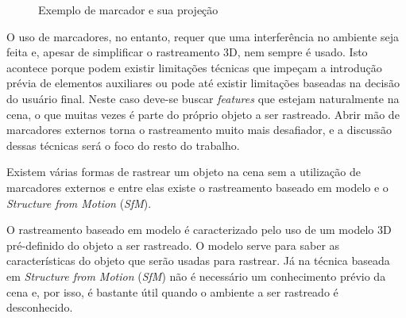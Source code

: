 \begin{figure}[!ht]
	\centerline{
		\hfil
	}
	\caption{Exemplo de marcador e sua projeção}
\end{figure}

O uso de marcadores, no entanto, requer que uma interferência no ambiente seja feita e, apesar de simplificar o rastreamento 3D, nem sempre é usado. Isto acontece porque podem existir limitações técnicas que impeçam a introdução prévia de elementos auxiliares ou pode até existir limitações baseadas na decisão do usuário final. Neste caso deve-se buscar \emph{features} que estejam naturalmente na cena, o que muitas vezes é parte do próprio objeto a ser rastreado. Abrir mão de marcadores externos torna o rastreamento muito mais desafiador, e a discussão dessas técnicas será o foco do resto do trabalho.

Existem várias formas de rastrear um objeto na cena sem a utilização de marcadores externos \cite{teichrieb2007survey} e entre elas existe o rastreamento baseado em modelo e o \emph{Structure from Motion} (\emph{SfM}).

O rastreamento baseado em modelo é caracterizado pelo uso de um modelo 3D pré-definido do objeto a ser rastreado. O modelo serve para saber as características do objeto que serão usadas para rastrear. Já na técnica baseada em \emph{Structure from Motion} (\emph{SfM}) \cite{teichrieb2007survey} não é necessário um conhecimento prévio da cena e, por isso, é bastante útil quando o ambiente a ser rastreado é desconhecido.

